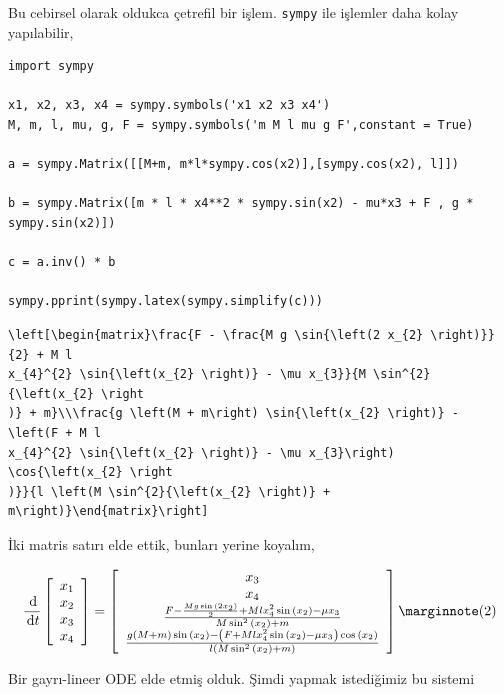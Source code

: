 \documentclass[12pt,fleqn]{article}\usepackage{../../common}
\begin{document}
Bu cebirsel olarak oldukca çetrefil bir işlem. \verb!sympy! ile işlemler
daha kolay yapılabilir,

\begin{verbatim}
import sympy

x1, x2, x3, x4 = sympy.symbols('x1 x2 x3 x4')
M, m, l, mu, g, F = sympy.symbols('m M l mu g F',constant = True)

a = sympy.Matrix([[M+m, m*l*sympy.cos(x2)],[sympy.cos(x2), l]])

b = sympy.Matrix([m * l * x4**2 * sympy.sin(x2) - mu*x3 + F , g * sympy.sin(x2)])

c = a.inv() * b

sympy.pprint(sympy.latex(sympy.simplify(c)))
\end{verbatim}

\begin{verbatim}
\left[\begin{matrix}\frac{F - \frac{M g \sin{\left(2 x_{2} \right)}}{2} + M l 
x_{4}^{2} \sin{\left(x_{2} \right)} - \mu x_{3}}{M \sin^{2}{\left(x_{2} \right
)} + m}\\\frac{g \left(M + m\right) \sin{\left(x_{2} \right)} - \left(F + M l 
x_{4}^{2} \sin{\left(x_{2} \right)} - \mu x_{3}\right) \cos{\left(x_{2} \right
)}}{l \left(M \sin^{2}{\left(x_{2} \right)} + m\right)}\end{matrix}\right]
\end{verbatim}

İki matris satırı elde ettik, bunları yerine koyalım,

$$
\frac{\ud}{\ud t} \left[\begin{array}{rrr}
x_1 \\ x_2 \\ x_3 \\ x_4
\end{array}\right] = 
\left[\begin{array}{c}
x_3 \\ x_4 \\ 
\frac{F - \frac{M g \sin{\left(2 x_{2} \right)}}{2} + M l 
x_{4}^{2} \sin{\left(x_{2} \right)} - \mu x_{3}}{M \sin^{2}{\left(x_{2} \right
)} + m} \\
\frac{g \left(M + m\right) \sin{\left(x_{2} \right)} - \left(F + M l 
x_{4}^{2} \sin{\left(x_{2} \right)} - \mu x_{3}\right) \cos{\left(x_{2} \right
)}}{l \left(M \sin^{2}{\left(x_{2} \right)} + m\right)}
\end{array}\right]
\mlabel{2}
$$

Bir gayrı-lineer ODE elde etmiş olduk. Şimdi yapmak istediğimiz bu sistemi 
\end{document}
